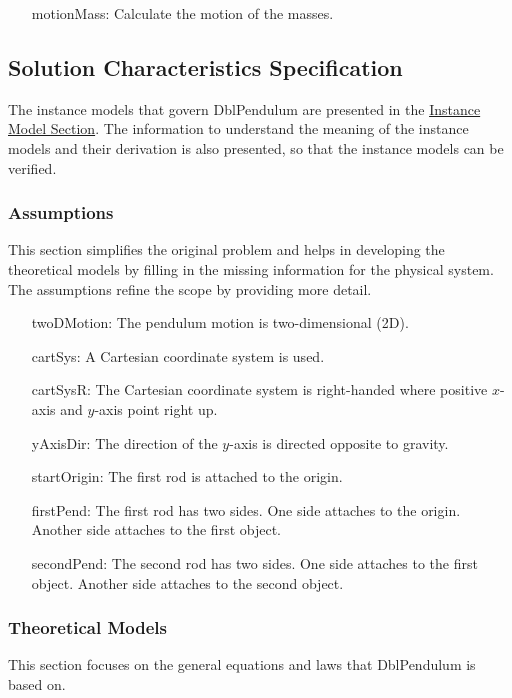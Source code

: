 \documentclass[12pt]{article}
\begin{document}
\begin{itemize}
\item[motionMass:\phantomsection\label{motionMass}]{Calculate the motion of the masses.}
\end{itemize}
\subsection{Solution Characteristics Specification}
\label{Sec:SolCharSpec}
The instance models that govern DblPendulum are presented in the \hyperref[Sec:IMs]{Instance Model Section}. The information to understand the meaning of the instance models and their derivation is also presented, so that the instance models can be verified.

\subsubsection{Assumptions}
\label{Sec:Assumps}
This section simplifies the original problem and helps in developing the theoretical models by filling in the missing information for the physical system. The assumptions refine the scope by providing more detail.

\begin{itemize}
\item[twoDMotion:\phantomsection\label{twoDMotion}]{The pendulum motion is two-dimensional (2D).}
\item[cartSys:\phantomsection\label{cartSys}]{A Cartesian coordinate system is used.}
\item[cartSysR:\phantomsection\label{cartSysR}]{The Cartesian coordinate system is right-handed where positive $x$-axis and $y$-axis point right up.}
\item[yAxisDir:\phantomsection\label{yAxisDir}]{The direction of the $y$-axis is directed opposite to gravity.}
\item[startOrigin:\phantomsection\label{startOrigin}]{The first rod is attached to the origin.}
\item[firstPend:\phantomsection\label{firstPend}]{The first rod has two sides. One side attaches to the origin. Another side attaches to the first object.}
\item[secondPend:\phantomsection\label{secondPend}]{The second rod has two sides. One side attaches to the first object. Another side attaches to the second object.}
\end{itemize}
\subsubsection{Theoretical Models}
\label{Sec:TMs}
This section focuses on the general equations and laws that DblPendulum is based on.
\end{document}
